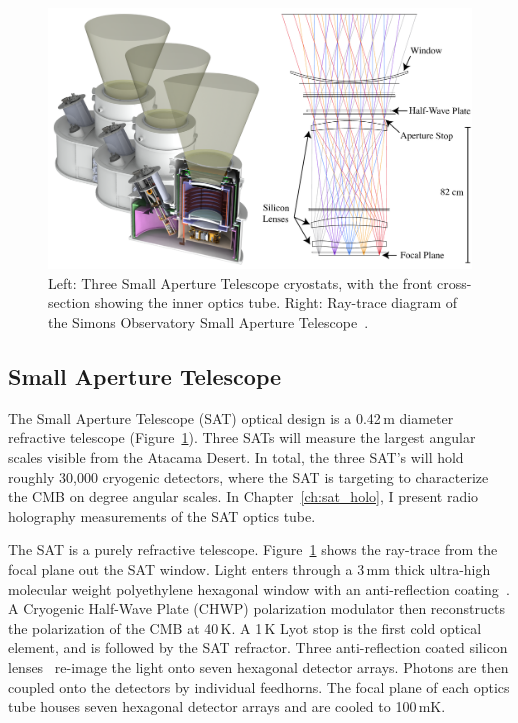 \begin{figure}[ht]
    \centering
    \includegraphics[width = \textwidth]{Figures/SAT3.pdf}
    \caption{Left: Three Small Aperture Telescope cryostats, with the front cross-section showing the inner optics tube.  Right: Ray-trace diagram of the Simons Observatory Small Aperture Telescope~\cite{2020SPIE11445E7LK}.}
    \label{fig:sat3s}
\end{figure}

\subsection{Small Aperture Telescope}

The Small Aperture Telescope (SAT) optical design is a 0.42\,m diameter refractive telescope (Figure~\ref{fig:sat3s}).  Three SATs will measure the largest angular scales visible from the Atacama Desert.  In total, the three SAT's will hold roughly 30,000 cryogenic detectors, where the SAT is targeting to characterize the CMB on degree angular scales.  In Chapter~\ref{ch:sat_holo}, I present radio holography measurements of the SAT optics tube.

The SAT is a purely refractive telescope.  Figure~\ref{fig:sat3s} shows the ray-trace from the focal plane out the SAT window.  Light enters through a 3\,mm thick ultra-high molecular weight polyethylene hexagonal window with an anti-reflection coating~\cite{zhu18}.  A Cryogenic Half-Wave Plate (CHWP) polarization modulator then reconstructs the polarization of the CMB at 40\,K.  A 1\,K Lyot stop is the first cold optical element, and is followed by the SAT refractor.  Three anti-reflection coated silicon lenses~\cite{Datta:13,golec20} re-image the light onto seven hexagonal detector arrays.   Photons are then coupled onto the detectors by individual feedhorns.  The focal plane of each optics tube houses seven hexagonal detector arrays and are cooled to 100\,mK.

